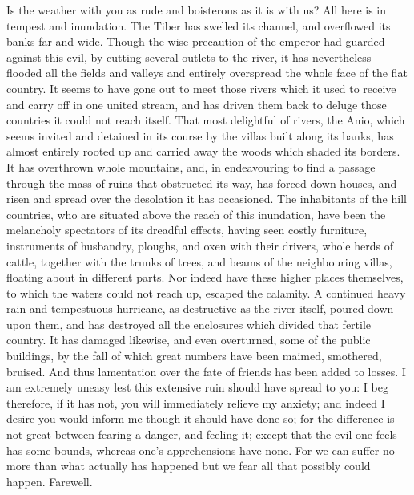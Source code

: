 Is the weather with you as rude and boisterous as it is with us? All here
is in tempest and inundation. The Tiber has swelled its channel, and
overflowed its banks far and wide. Though the wise precaution of the
emperor had guarded against this evil, by cutting several outlets to the
river, it has nevertheless flooded all the fields and valleys and entirely
overspread the whole face of the flat country. It seems to have gone out
to meet those rivers which it used to receive and carry off in one united
stream, and has driven them back to deluge those countries it could not
reach itself. That most delightful of rivers, the Anio, which seems
invited and detained in its course by the villas built along its banks,
has almost entirely rooted up and carried away the woods which shaded its
borders. It has overthrown whole mountains, and, in endeavouring to find a
passage through the mass of ruins that obstructed its way, has forced down
houses, and risen and spread over the desolation it has occasioned. The
inhabitants of the hill countries, who are situated above the reach of
this inundation, have been the melancholy spectators of its dreadful
effects, having seen costly furniture, instruments of husbandry, ploughs,
and oxen with their drivers, whole herds of cattle, together with the
trunks of trees, and beams of the neighbouring villas, floating about in
different parts. Nor indeed have these higher places themselves, to which
the waters could not reach up, escaped the calamity. A continued heavy
rain and tempestuous hurricane, as destructive as the river itself, poured
down upon them, and has destroyed all the enclosures which divided that
fertile country. It has damaged likewise, and even overturned, some of the
public buildings, by the fall of which great numbers have been maimed,
smothered, bruised. And thus lamentation over the fate of friends has been
added to losses. I am extremely uneasy lest this extensive ruin should
have spread to you: I beg therefore, if it has not, you will immediately
relieve my anxiety; and indeed I desire you would inform me though it
should have done so; for the difference is not great between fearing a
danger, and feeling it; except that the evil one feels has some bounds,
whereas one's apprehensions have none. For we can suffer no more than what
actually has happened but we fear all that possibly could happen.
Farewell.


